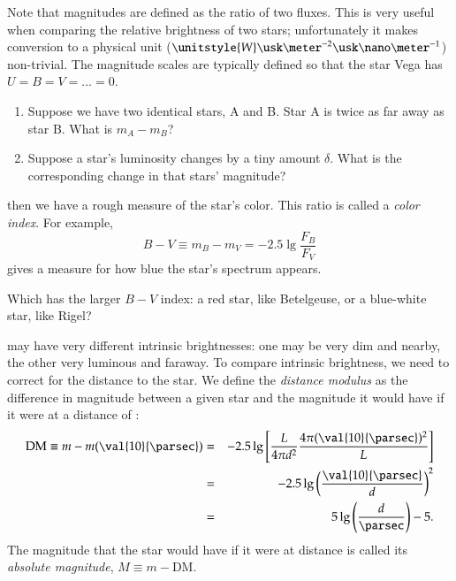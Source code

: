 Note that magnitudes are defined as the ratio of two fluxes. This is very useful when comparing the relative brightness of two stars; unfortunately it makes conversion to a physical unit ($\unitstyle{W}\usk\meter^{-2}\usk\nano\meter^{-1}$) non-trivial.  The magnitude scales are typically defined so that the star Vega has $U=B=V=\ldots=0$.


\newpage
\begin{exercisebox}
\begin{enumerate} 
\item Suppose we have two identical stars, A and B. Star A is twice as far away as star B. What is $m_{A} - m_{B}$?
\item Suppose a star's luminosity changes by a tiny amount $\delta$.  What is the corresponding change in that stars' magnitude?
\end{enumerate}
\end{exercisebox}

 then we have a rough measure of the star's color.  This ratio is called a \emph{color index}.  For example, 
\[ B - V \equiv m_{B} - m_{V} = -2.5\lg\frac{F_{B}}{F_{V}} \]
gives a measure for how blue the star's spectrum appears.

\begin{exercisebox}
Which has the larger $B-V$ index: a red star, like Betelgeuse, or a blue-white star, like Rigel?
\end{exercisebox}

 may have very different intrinsic brightnesses: one may be very dim and nearby, the other very luminous and faraway.  To compare intrinsic brightness, we need to correct for the distance to the star.  We define the \emph{distance modulus} as the difference in magnitude between a given star and the magnitude it would have if it were at a distance of :
\begin{eqnarray*}
 \mathrm{DM} \equiv m - m(\val{10}{\parsec}) &=& -2.5\lg\left[\frac{L}{4\pi d^{2}} \frac{4\pi (\val{10}{\parsec})^{2}}{L}\right] \\
 	&=& -2.5\lg\left(\frac{\val{10}{\parsec}}{d}\right)^{2} \\
	&=& 5\lg\left(\frac{d}{\parsec}\right) - 5.
\end{eqnarray*}
The magnitude that the star would have if it were at  distance is called its \emph{absolute magnitude}, $M \equiv m - \mathrm{DM}$.

